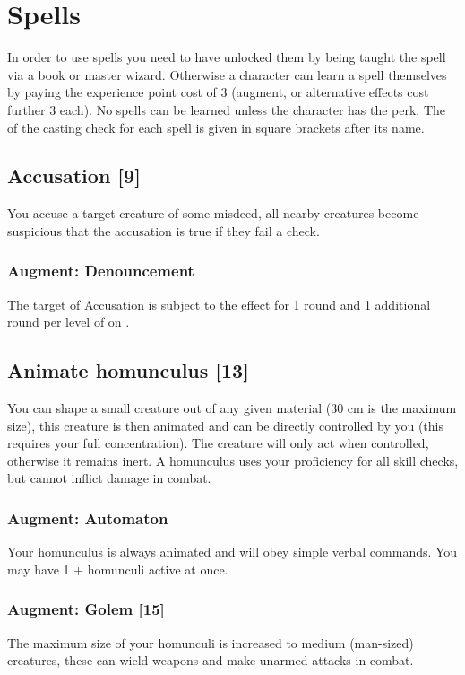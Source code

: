 \section{Spells}
\label{sec:spells}

In order to use spells you need to have unlocked them by being taught the spell via a book or master wizard. Otherwise a character can learn a spell themselves by paying the experience point cost of 3 (augment, or alternative effects cost further 3 each). No spells can be learned unless the character has the  perk. The  of the casting check for each spell is given in square brackets after its name.

\subsection{Accusation [9]}
You accuse a target creature of some misdeed, all nearby creatures become suspicious that the accusation is true if they fail a  check.
\subsubsection{Augment: Denouncement}
The target of Accusation is subject to the  effect for 1 round and 1 additional round per level of  on .


\subsection{Animate homunculus [13]}
You can shape a small creature out of any given material (30 cm is the maximum size), this creature is then animated and can be directly controlled by you (this requires your full concentration). The creature will only act when controlled, otherwise it remains inert. A homunculus uses your  proficiency for all skill checks, but cannot inflict damage in combat.
\subsubsection{Augment: Automaton}
Your homunculus is always animated and will obey simple verbal commands. You may have 1 +  homunculi active at once. 
\subsubsection{Augment: Golem [15]}
The maximum size of your homunculi is increased to medium (man-sized) creatures, these can wield weapons and make unarmed attacks in combat.


